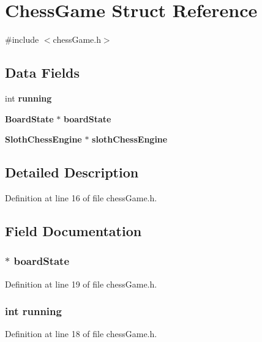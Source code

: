 \section{Chess\+Game Struct Reference}
\label{struct_chess_game}


{\ttfamily \#include $<$chess\+Game.\+h$>$}

\subsection*{Data Fields}
\begin{DoxyCompactItemize}
\item 
int {\bf running}
\item 
{\bf Board\+State} $\ast$ {\bf board\+State}
\item 
{\bf Sloth\+Chess\+Engine} $\ast$ {\bf sloth\+Chess\+Engine}
\end{DoxyCompactItemize}


\subsection{Detailed Description}


Definition at line 16 of file chess\+Game.\+h.



\subsection{Field Documentation}
\subsubsection[{board\+State}]{$\ast$ board\+State}\label{struct_chess_game_ad3741ae8335da0e4c924b916ebe0530e}


Definition at line 19 of file chess\+Game.\+h.

\subsubsection[{running}]{\setlength{\rightskip}{0pt plus 5cm}int running}\label{struct_chess_game_a2f45113638a0b749a8a205d2cd7fb42b}


Definition at line 18 of file chess\+Game.\+h.

